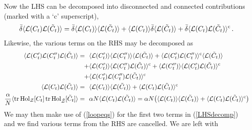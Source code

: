 \documentclass[12pt]{article}
\def \be  {\begin{equation}}
\def \ee  {\end{equation}}
\def \tr {\mathop{\rm tr}\nolimits}
\numberwithin{equation}{section}
\begin{document}
Now the LHS can be decomposed into disconnected and connected contributions (marked with a `c' superscript),
\be
\bar{\delta} \langle \mathcal{L}(C_t) \mathcal{L}(\tilde{C}_t)\rangle =  \bar{\delta} \langle \mathcal{L}(C_t) \rangle \langle \mathcal{L}(\tilde{C}_t)\rangle + \langle \mathcal{L}(C_t) \rangle \bar{\delta} \langle \mathcal{L}(\tilde{C}_t)\rangle + \bar{\delta} \langle \mathcal{L}(C_t) \mathcal{L}(\tilde{C}_t)\rangle^{\rm c}\,.
\label{LHSdecomp}
\ee
Likewise, the various terms on the RHS may be decomposed as
\begin{align}
    \langle \mathcal{L}(C^\prime_t) \mathcal{L}(C^{\prime \prime}_t) \mathcal{L}(\tilde{C}_t)\rangle = \,\,\,\,&\langle \mathcal{L}(C^\prime_t) \rangle \langle \mathcal{L}(C^{\prime \prime}_t) \rangle \langle \mathcal{L}(\tilde{C}_t)\rangle + \langle \mathcal{L}(C^\prime_t)  \mathcal{L}(C^{\prime \prime}_t) \rangle^{\rm c} \langle \mathcal{L}(\tilde{C}_t)\rangle \notag \\
    + &\langle \mathcal{L}(C^\prime_t) \rangle \langle \mathcal{L}(C^{\prime \prime}_t) \mathcal{L}(\tilde{C}_t)\rangle^{\rm c} + \langle \mathcal{L}(C^{\prime \prime}_t) \rangle \langle \mathcal{L}(C^{\prime}_t) \mathcal{L}(\tilde{C}_t)\rangle^{\rm c} \notag \\
    + &\langle \mathcal{L}(C^\prime_t)  \mathcal{L}(C^{\prime \prime}_t) \mathcal{L}(\tilde{C}_t)\rangle^{\rm c} \\
    \langle \mathcal{L}(C_t) \mathcal{L}(\tilde{C}_t)\rangle =\,\,\,\, &\langle \mathcal{L}(C_t) \rangle \langle \mathcal{L}(\tilde{C}_t)\rangle + \langle \mathcal{L}(C_t) \mathcal{L}(\tilde{C}_t)\rangle^{\rm c} \\
    \frac{\alpha}{N} \langle \tr {\rm Hol}_{\mathcal{Z}}[C_t] \tr {\rm Hol}_{\tilde{\mathcal{Z}}}[\tilde{C}_t]\rangle = \,\,\,\, & \alpha N \langle \mathcal{L}(C_t) \mathcal{L}(\tilde{C}_t)\rangle = \alpha N\bigl(\langle \mathcal{L}(C_t) \rangle \langle \mathcal{L}(\tilde{C}_t)\rangle + \langle \mathcal{L}(C_t) \mathcal{L}(\tilde{C}_t)\rangle^{\rm c}\bigr)
\end{align}
We may then make use of (\ref{loopeqs}) for the first two terms in (\ref{LHSdecomp}) and we find various terms from the RHS are cancelled. We are left with 
\end{document}
